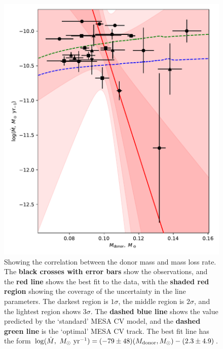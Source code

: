 \begin{figure}
    \centering
    \includegraphics[width=\textwidth]{figures/results/Mdot/Mr_Mdot.pdf}
    \caption{Showing the correlation between the donor mass and mass loss rate. The {\bf black crosses with error bars} show the observations, and the {\bf red line} shows the best fit to the data, with the {\bf shaded red region} showing the coverage of the uncertainty in the line parameters. The darkest region is $1\sigma$, the middle region is $2\sigma$, and the lightest region shows $3\sigma$. The {\bf dashed blue line} shows the value predicted by the `standard' MESA CV model, and the {\bf dashed green line} is the `optimal' MESA CV track. The best fit line has the form $\log (\dot M,\ M_\odot\ {\rm yr}^{-1}) = (-79\pm48) (M_{\rm donor}, M_\odot) - (2.3\pm4.9)$. }
    \label{fig:discussion:donor mass vs Mdot fit}
\end{figure}
